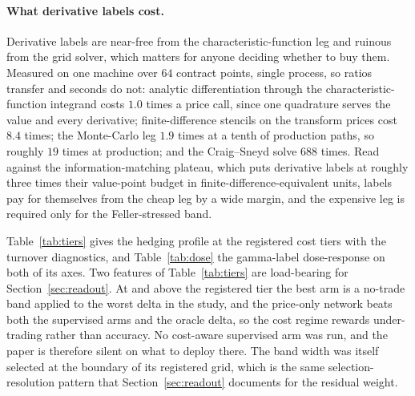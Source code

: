 \documentclass{article}
\begin{document}
\paragraph{What derivative labels cost.} Derivative labels are near-free from the
characteristic-function leg and ruinous from the grid solver, which matters for
anyone deciding whether to buy them. Measured on one machine over $64$ contract
points, single process, so ratios transfer and seconds do not: analytic
differentiation through the characteristic-function integrand costs $1.0$ times a
price call, since one quadrature serves the value and every derivative;
finite-difference stencils on the transform prices cost $8.4$ times; the
Monte-Carlo leg $1.9$ times at a tenth of production paths, so roughly $19$ times at
production; and the Craig--Sneyd solve $688$ times. Read against the
information-matching plateau, which puts derivative labels at roughly three times
their value-point budget in finite-difference-equivalent units, labels pay for
themselves from the cheap leg by a wide margin, and the expensive leg is required
only for the Feller-stressed band.


Table~\ref{tab:tiers} gives the hedging profile at the registered cost tiers with
the turnover diagnostics, and Table~\ref{tab:dose} the gamma-label dose-response on
both of its axes. Two features of Table~\ref{tab:tiers} are load-bearing for
Section~\ref{sec:readout}. At and above the registered tier the best arm is a
no-trade band applied to the worst delta in the study, and the price-only network
beats both the supervised arms and the oracle delta, so the cost regime rewards
under-trading rather than accuracy. No cost-aware supervised arm was run, and the
paper is therefore silent on what to deploy there. The band width was itself
selected at the boundary of its registered grid, which is the same
selection-resolution pattern that Section~\ref{sec:readout} documents for the
residual weight.
\end{document}

